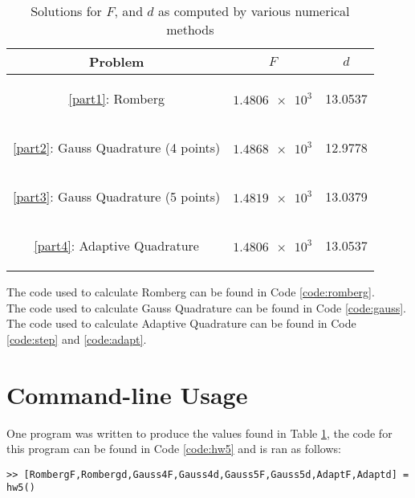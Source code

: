 \documentclass[11pt]{article}
\begin{document}
\begin{table}[H]
    \label{tab:solution}
    \caption{Solutions for $F$, and $d$ as computed by various numerical methods}
\begin{center}
\begin{tabular}{|c||c||c|}
     \hline
     Problem&$F$&$d$  \\
     \hline \hline
     \begin{flushleft} \ref{part1}: Romberg\end{flushleft} & $\num{1.4806e3}$ & 13.0537 \\
     \hline
     \begin{flushleft} \ref{part2}: Gauss Quadrature (4 points) \end{flushleft}& $\num{1.4868e3}$ & 12.9778 \\
     \hline
     \begin{flushleft} \ref{part3}: Gauss Quadrature (5 points)\end{flushleft} & $\num{1.4819e3}$ & 13.0379\\
     \hline
     \begin{flushleft} \ref{part4}: Adaptive Quadrature\end{flushleft} & $\num{1.4806e3}$ & 13.0537\\
     \hline
\end{tabular}
\end{center}
\end{table}


\medskip

The code used to calculate Romberg can be found in Code \ref{code:romberg}.\\
The code used to calculate Gauss Quadrature can be found in Code \ref{code:gauss}.\\
The code used to calculate Adaptive Quadrature can be found in Code \ref{code:step} and \ref{code:adapt}.



\section{Command-line Usage}
One program was written to produce the values found in Table \ref{tab:solution}, the code for this program can be found in Code \ref{code:hw5} and is ran as follows: 

\begin{verbatim}
>> [RombergF,Rombergd,Gauss4F,Gauss4d,Gauss5F,Gauss5d,AdaptF,Adaptd] = hw5()
\end{verbatim}
\end{document}
